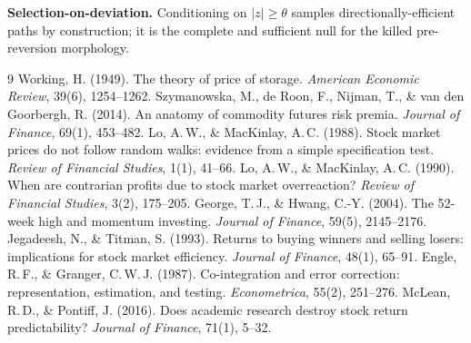 \documentclass[11pt,a4paper]{article}
\begin{document}
\textbf{Selection-on-deviation.} Conditioning on $|z|\geq\theta$ samples directionally-efficient paths
by construction; it is the complete and sufficient null for the killed pre-reversion morphology.

\begin{thebibliography}{9}
\small
{} Working, H. (1949). The theory of price of storage. \emph{American Economic
Review}, 39(6), 1254--1262.
 Szymanowska, M., de Roon, F., Nijman, T., \& van den Goorbergh, R. (2014).
An anatomy of commodity futures risk premia. \emph{Journal of Finance}, 69(1), 453--482.
 Lo, A.\,W., \& MacKinlay, A.\,C. (1988). Stock market prices do not follow
random walks: evidence from a simple specification test. \emph{Review of Financial Studies}, 1(1),
41--66.
 Lo, A.\,W., \& MacKinlay, A.\,C. (1990). When are contrarian profits due to
stock market overreaction? \emph{Review of Financial Studies}, 3(2), 175--205.
 George, T.\,J., \& Hwang, C.-Y. (2004). The 52-week high and momentum
investing. \emph{Journal of Finance}, 59(5), 2145--2176.
 Jegadeesh, N., \& Titman, S. (1993). Returns to buying winners and selling losers:
implications for stock market efficiency. \emph{Journal of Finance}, 48(1), 65--91.
 Engle, R.\,F., \& Granger, C.\,W.\,J. (1987). Co-integration and error
correction: representation, estimation, and testing. \emph{Econometrica}, 55(2), 251--276.
 McLean, R.\,D., \& Pontiff, J. (2016). Does academic research destroy stock
return predictability? \emph{Journal of Finance}, 71(1), 5--32.
\end{thebibliography}
\end{document}
